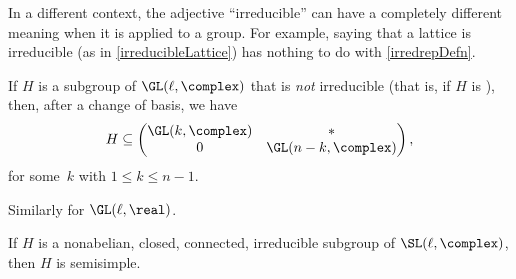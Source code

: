 \begin{warn}
 In a different context, the adjective ``irreducible'' can
have a completely different meaning when it is applied to a
group. For example, saying that a lattice is irreducible
(as in \cref{irreducibleLattice}) has nothing to do
with \cref{irredrepDefn}.
 \end{warn}

\begin{rem}
 If $H$ is a subgroup of $\GL(\ell,\complex)$ that is
\emph{not} irreducible (that is, if $H$ is
), then, after a
change of basis, we have
 $$ H \subseteq 
 \begin{pmatrix}
 \GL(k,\complex) & * \\
 0 & \GL(n-k,\complex)
 \end{pmatrix}
 ,$$
 for some~$k$ with $1 \le k \le n-1$.

Similarly for $\GL(\ell,\real)$.
 \end{rem}

\begin{cor} \label{irred->SS}
 If $H$ is a nonabelian, closed, connected, irreducible
subgroup of\/ $\SL(\ell,\complex)$, then $H$ is semisimple.
 \end{cor}


